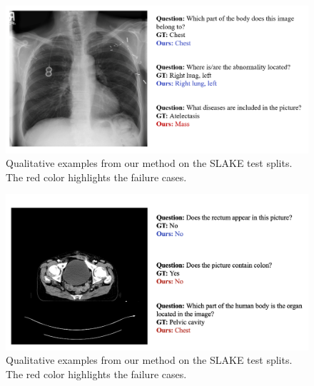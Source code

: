 \begin{figure}[t]
\begin{center}
\includegraphics[width=1.0\linewidth]{Chapter_4/chap4_result2.png}
\end{center}
   \caption{Qualitative examples from our method on the SLAKE test splits. The red color highlights the failure cases.
}
\label{fig:qualitative2}
\end{figure}


\begin{figure}[t]
\begin{center}
\includegraphics[width=1.0\linewidth]{Chapter_4/chap4_result8.png}
\end{center}
   \caption{Qualitative examples from our method on the SLAKE test splits. The red color highlights the failure cases.
}
\label{fig:qualitative8}
\end{figure}